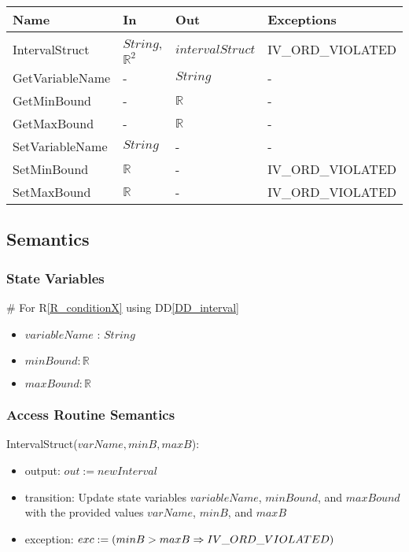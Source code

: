 \documentclass[12pt, titlepage]{article}
\newcommand{\rref}[1]{R\ref{#1}}
\newcommand{\ddref}[1]{DD\ref{#1}}
\begin{document}
\begin{center}
	\begin{tabular}{p{3cm} p{3cm} p{3cm} p{5cm}}
		\hline
		\textbf{Name} & \textbf{In} & \textbf{Out} & \textbf{Exceptions} \\
		\hline		
		IntervalStruct & $String$, $\mathbb{R}^2$ & $intervalStruct$ & 
		IV\_ORD\_VIOLATED \\
		GetVariableName & - & $String$ & - \\
		GetMinBound & - & $\mathbb{R}$ & - \\
		GetMaxBound & - & $\mathbb{R}$ & - \\
		SetVariableName & $String$ & - & - \\
		SetMinBound & $\mathbb{R}$ & - & IV\_ORD\_VIOLATED \\
		SetMaxBound & $\mathbb{R}$ & - & IV\_ORD\_VIOLATED \\
		\hline
	\end{tabular}
\end{center}

\subsection{Semantics}

\subsubsection{State Variables}

\# For \rref{R_conditionX} using \ddref{DD_interval}
\begin{itemize}
	\item $variableName$ : $String$
	\item $minBound : \mathbb{R}$
	\item $maxBound : \mathbb{R}$
\end{itemize}

\subsubsection{Access Routine Semantics}

\noindent IntervalStruct($varName, minB, maxB$):
\begin{itemize}
	\item output: $out := newInterval$
	\item transition: Update state variables $variableName$, $minBound$, and 
	$maxBound$ with the provided values $varName$, $minB$, and $maxB$
	\item exception: $exc := \\
	(minB > maxB \Rightarrow IV\_ORD\_VIOLATED)$
\end{itemize}
\end{document}
